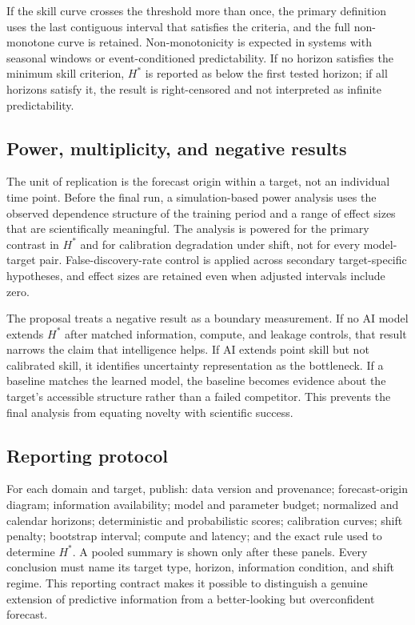 \documentclass[conference]{IEEEtran}
\begin{document}
If the skill curve crosses the threshold more than once, the primary definition uses the last contiguous interval that satisfies the criteria, and the full non-monotone curve is retained. Non-monotonicity is expected in systems with seasonal windows or event-conditioned predictability. If no horizon satisfies the minimum skill criterion, $H^*$ is reported as below the first tested horizon; if all horizons satisfy it, the result is right-censored and not interpreted as infinite predictability.

\subsection{Power, multiplicity, and negative results}
The unit of replication is the forecast origin within a target, not an individual time point. Before the final run, a simulation-based power analysis uses the observed dependence structure of the training period and a range of effect sizes that are scientifically meaningful. The analysis is powered for the primary contrast in $H^*$ and for calibration degradation under shift, not for every model-target pair. False-discovery-rate control is applied across secondary target-specific hypotheses, and effect sizes are retained even when adjusted intervals include zero.

The proposal treats a negative result as a boundary measurement. If no AI model extends $H^*$ after matched information, compute, and leakage controls, that result narrows the claim that intelligence helps. If AI extends point skill but not calibrated skill, it identifies uncertainty representation as the bottleneck. If a baseline matches the learned model, the baseline becomes evidence about the target's accessible structure rather than a failed competitor. This prevents the final analysis from equating novelty with scientific success.

\subsection{Reporting protocol}
For each domain and target, publish: data version and provenance; forecast-origin diagram; information availability; model and parameter budget; normalized and calendar horizons; deterministic and probabilistic scores; calibration curves; shift penalty; bootstrap interval; compute and latency; and the exact rule used to determine $H^*$. A pooled summary is shown only after these panels. Every conclusion must name its target type, horizon, information condition, and shift regime. This reporting contract makes it possible to distinguish a genuine extension of predictive information from a better-looking but overconfident forecast.
\end{document}
